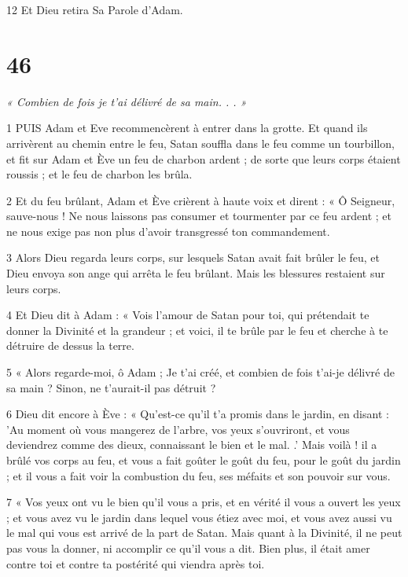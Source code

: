 \par 12 Et Dieu retira Sa Parole d'Adam.

\chapter{46}

\par \textit{« Combien de fois je t'ai délivré de sa main. . . »}

\par 1 PUIS Adam et Eve recommencèrent à entrer dans la grotte. Et quand ils arrivèrent au chemin entre le feu, Satan souffla dans le feu comme un tourbillon, et fit sur Adam et Ève un feu de charbon ardent ; de sorte que leurs corps étaient roussis ; et le feu de charbon les brûla.

\par 2 Et du feu brûlant, Adam et Ève crièrent à haute voix et dirent : « Ô Seigneur, sauve-nous ! Ne nous laissons pas consumer et tourmenter par ce feu ardent ; et ne nous exige pas non plus d’avoir transgressé ton commandement.

\par 3 Alors Dieu regarda leurs corps, sur lesquels Satan avait fait brûler le feu, et Dieu envoya son ange qui arrêta le feu brûlant. Mais les blessures restaient sur leurs corps.

\par 4 Et Dieu dit à Adam : « Vois l'amour de Satan pour toi, qui prétendait te donner la Divinité et la grandeur ; et voici, il te brûle par le feu et cherche à te détruire de dessus la terre.

\par 5 « Alors regarde-moi, ô Adam ; Je t'ai créé, et combien de fois t'ai-je délivré de sa main ? Sinon, ne t’aurait-il pas détruit ?

\par 6 Dieu dit encore à Ève : « Qu'est-ce qu'il t'a promis dans le jardin, en disant : 'Au moment où vous mangerez de l'arbre, vos yeux s'ouvriront, et vous deviendrez comme des dieux, connaissant le bien et le mal. .' Mais voilà ! il a brûlé vos corps au feu, et vous a fait goûter le goût du feu, pour le goût du jardin ; et il vous a fait voir la combustion du feu, ses méfaits et son pouvoir sur vous.

\par 7 « Vos yeux ont vu le bien qu'il vous a pris, et en vérité il vous a ouvert les yeux ; et vous avez vu le jardin dans lequel vous étiez avec moi, et vous avez aussi vu le mal qui vous est arrivé de la part de Satan. Mais quant à la Divinité, il ne peut pas vous la donner, ni accomplir ce qu'il vous a dit. Bien plus, il était amer contre toi et contre ta postérité qui viendra après toi.

